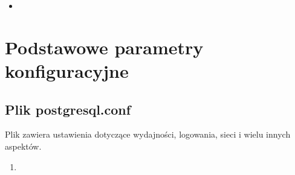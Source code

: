 \documentclass[letterpaper,10pt,polish]{sphinxmanual}
\begin{document}
\begin{sphinxVerbatim}[commandchars=\\\{\}]
\end{sphinxVerbatim}
\begin{itemize}
\item {} 
\sphinxAtStartPar
{}

\end{itemize}

\begin{sphinxVerbatim}[commandchars=\\\{\}]
\end{sphinxVerbatim}

\sphinxstepscope


\chapter{Podstawowe parametry konfiguracyjne}
\label{\detokenize{DB-Konfiguracja-bazy-danych/source/rozdzialy/rozdzial3:podstawowe-parametry-konfiguracyjne}}\label{\detokenize{DB-Konfiguracja-bazy-danych/source/rozdzialy/rozdzial3::doc}}

\section{Plik postgresql.conf}
\label{\detokenize{DB-Konfiguracja-bazy-danych/source/rozdzialy/rozdzial3:plik-postgresql-conf}}
\sphinxAtStartPar
Plik  zawiera ustawienia dotyczące wydajności, logowania, sieci i wielu innych aspektów.

\sphinxAtStartPar
{}
\begin{enumerate}
%
\item {} 
\sphinxAtStartPar
{}

\end{enumerate}
\end{document}
